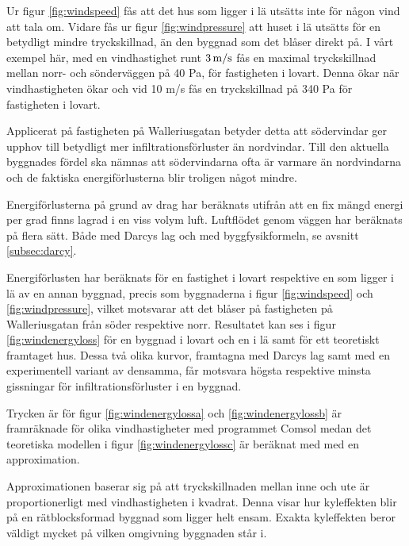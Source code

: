 Ur figur \ref{fig:windspeed} fås att det hus som ligger i lä utsätts inte för någon vind att tala om.
 Vidare fås ur figur \ref{fig:windpressure} att huset i lä utsätts för en betydligt mindre 
 tryckskillnad, än den byggnad som det blåser direkt på. I vårt exempel här, med en 
 vindhastighet runt $\unit[3]{m/s}$ fås en maximal tryckskillnad mellan norr- och sönderväggen 
 på 40 Pa, för fastigheten i lovart. Denna ökar när vindhastigheten ökar och vid 10 m/s fås en 
 tryckskillnad på 340 Pa för fastigheten i lovart. 

Applicerat på fastigheten på Walleriusgatan betyder detta att södervindar ger upphov till 
betydligt mer infiltrationsförluster än nordvindar. Till den aktuella byggnades fördel ska nämnas 
att södervindarna ofta är varmare än nordvindarna och de faktiska energiförlusterna blir 
troligen något mindre.


Energiförlusterna på grund av drag har beräknats utifrån att en fix mängd energi per grad finns lagrad i en viss volym luft. Luftflödet genom väggen har beräknats på flera sätt. Både med Darcys lag och med byggfysikformeln, se avsnitt \ref{subsec:darcy}.

Energiförlusten har beräknats
  för en fastighet i lovart respektive en som ligger i lä av en annan byggnad, precis som 
  byggnaderna i figur \ref{fig:windspeed} och \ref{fig:windpressure}, vilket motsvarar att det 
  blåser på fastigheten på Walleriusgatan från söder respektive norr. Resultatet kan ses i figur 
  \ref{fig:windenergyloss} för en byggnad i lovart och en i lä samt för ett teoretiskt framtaget hus. Dessa två olika kurvor, framtagna med Darcys lag samt med en experimentell variant av densamma, får motsvara högsta respektive minsta gissningar för infiltrationsförluster i en byggnad.

Trycken är för figur \ref{fig:windenergylossa} och \ref{fig:windenergylossb} är framräknade för 
olika vindhastigheter med programmet Comsol medan det teoretiska modellen i figur 
\ref{fig:windenergylossc} är beräknat med med en approximation. 

Approximationen baserar sig
 på att tryckskillnaden mellan inne och ute är proportionerligt med vindhastigheten i kvadrat. Denna visar hur kyleffekten blir på en rätblocksformad byggnad som ligger helt ensam. Exakta kyleffekten beror väldigt mycket på vilken omgivning byggnaden står i.


